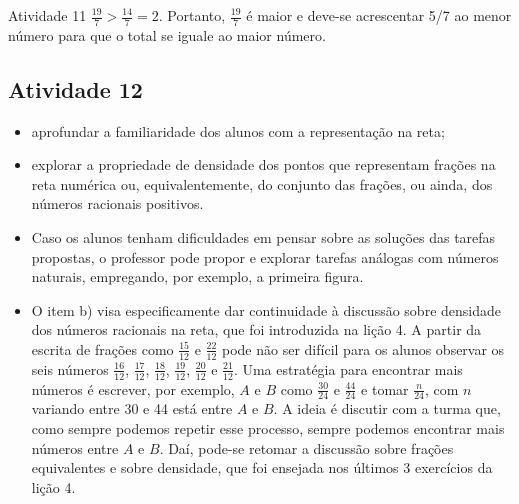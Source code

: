 \begin{multicols}{2}
\begin{resposta*}{Atividade 11}
$\frac{19}{7} > \frac{14}{7} = 2$. Portanto, $\frac{19}{7}$ é maior e deve-se acrescentar 5/7 ao menor número para que o total se iguale ao maior número.
\end{resposta*}


\subsection{Atividade 12}

  \newline \vspace{.15cm}

  \begin{itemize} %
    \item       aprofundar a familiaridade dos alunos com a representação na reta;
    \item       explorar a propriedade de densidade dos pontos que representam frações na reta numérica ou, equivalentemente, do conjunto das frações, ou ainda, dos números racionais positivos.
  \end{itemize} %


   \vspace{.15cm}

  \begin{itemize} %
    \item       Caso os alunos tenham dificuldades em pensar sobre as soluções das tarefas propostas, o professor pode propor e explorar tarefas análogas com números naturais, empregando, por exemplo, a primeira figura.
    \item O item b) visa especificamente dar continuidade à discussão sobre densidade dos números racionais na reta, que foi introduzida na lição 4. A partir da escrita de frações como $\frac{15}{12}$ e $\frac{22}{12}$       pode não ser difícil para os alunos observar os seis números       $\frac{16}{12}$,       $\frac{17}{12}$,       $\frac{18}{12}$,       $\frac{19}{12}$, $\frac{20}{12}$ e $\frac{21}{12}$. Uma estratégia para encontrar mais números é escrever, por exemplo,       $A$       e       $B$       como       $\frac{30}{24}$       e       $\frac{44}{24}$ e tomar       $\frac{n}{24}$, com       $n$       variando entre 30 e 44 está entre       $A$       e       $B$. A ideia é discutir com a turma que, como sempre podemos repetir esse processo, sempre podemos encontrar mais números entre       $A$       e       $B$. Daí, pode-se retomar a discussão sobre frações equivalentes e sobre densidade, que foi ensejada nos últimos 3 exercícios da lição 4.
  \end{itemize} %


\end{multicols}

